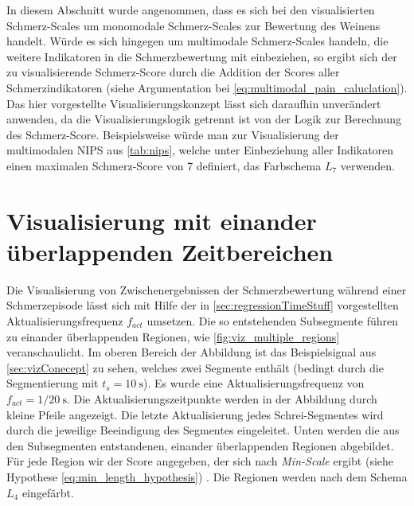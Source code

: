 In diesem Abschnitt wurde angenommen, dass es sich bei den visualisierten Schmerz-Scales um monomodale Schmerz-Scales zur Bewertung des Weinens handelt. Würde es sich hingegen um multimodale Schmerz-Scales handeln, die weitere Indikatoren in die Schmerzbewertung mit einbeziehen, so ergibt sich der zu visualisierende Schmerz-Score durch die Addition der Scores aller Schmerzindikatoren (siehe Argumentation bei  \autoref{eq:multimodal_pain_caluclation}). Das hier vorgestellte Visualisierungskonzept lässt sich daraufhin unverändert anwenden, da die Visualisierungslogik getrennt ist von der Logik zur Berechnung des Schmerz-Score. Beispielsweise würde man zur Visualisierung der multimodalen NIPS aus \autoref{tab:nips}, welche unter Einbeziehung aller Indikatoren einen maximalen Schmerz-Score von 7 definiert, das Farbschema $L_7$ verwenden.

 
\section{Visualisierung mit einander überlappenden Zeitbereichen}
\label{sec:vizWithOverlap}
 
Die Visualisierung von \glqq Zwischenergebnissen\grqq{} der Schmerzbewertung während einer Schmerzepisode lässt sich mit Hilfe der in \autoref{sec:regressionTimeStuff} vorgestellten Aktualisierungsfrequenz $f_{act}$ umsetzen. Die so entstehenden Subsegmente führen zu einander überlappenden Regionen, wie \autoref{fig:viz_multiple_regions} veranschaulicht. Im oberen Bereich der Abbildung ist das Beispielsignal aus \autoref{sec:vizConecept} zu sehen, welches zwei Segmente enthält (bedingt durch die Segmentierung mit $t_s = \SI{10}{\second}$). Es wurde eine Aktualisierungsfrequenz von  $f_{act} = 1/ \SI{20}{\second}$. Die Aktualisierungszeitpunkte werden in der Abbildung durch kleine Pfeile angezeigt. Die letzte Aktualisierung jedes Schrei-Segmentes wird durch die jeweilige Beeindigung des Segmentes eingeleitet. Unten werden die aus den Subsegmenten entstandenen, einander überlappenden Regionen abgebildet. Für jede Region wir der Score angegeben, der sich nach \emph{Min-Scale} ergibt (siehe Hypothese \autoref{eq:min_length_hypothesis}) . Die Regionen werden nach dem Schema $L_4$ eingefärbt.

